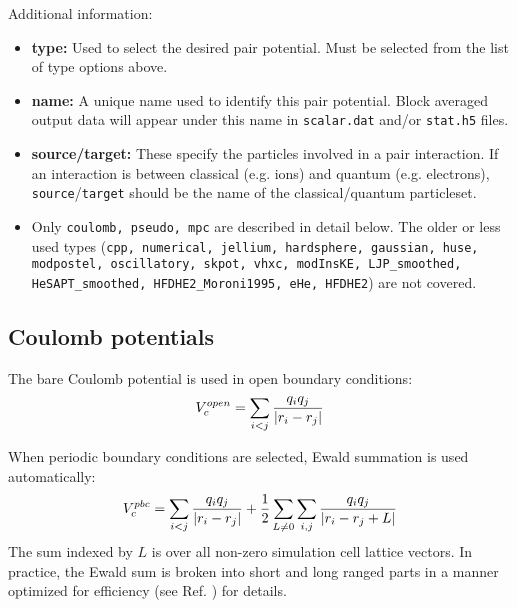 Additional information:
\begin{itemize}
  \item{\textbf{type:} Used to select the desired pair potential.  Must be selected from the list of type options above.}
  \item{\textbf{name:} A unique name used to identify this pair potential.  Block averaged output data will appear under this name in \texttt{scalar.dat} and/or \texttt{stat.h5} files.}
  \item{\textbf{source/target:}  These specify the particles involved in a pair interaction.  If an interaction is between classical (e.g. ions) and quantum (e.g. electrons), \texttt{source}/\texttt{target} should be the name of the classical/quantum particleset.}
  \item{Only \texttt{coulomb, pseudo, mpc} are described in detail below.  The older or less used types (\texttt{cpp, numerical, jellium, hardsphere, gaussian, huse, modpostel, oscillatory, skpot, vhxc, modInsKE, LJP\_smoothed, HeSAPT\_smoothed, HFDHE2\_Moroni1995, eHe, HFDHE2}) are not covered.}
\end{itemize}







\subsection{Coulomb potentials}

The bare Coulomb potential is used in open boundary conditions:
\begin{align}
  V_c^{open} = \sum_{i<j}\frac{q_iq_j}{\abs{r_i-r_j}}
\end{align}

When periodic boundary conditions are selected, Ewald summation is used automatically:
\begin{align}\label{eq:ewald}
  V_c^{pbc} = \sum_{i<j}\frac{q_iq_j}{\abs{r_i-r_j}} + \frac{1}{2}\sum_{L\ne0}\sum_{i,j}\frac{q_iq_j}{\abs{r_i-r_j+L}}
\end{align}
The sum indexed by $L$ is over all non-zero simulation cell lattice vectors.  In practice, the Ewald sum is broken into short and long ranged parts in a manner optimized for efficiency (see Ref. \cite{Natoli1995}) for details. 

